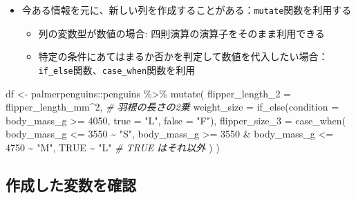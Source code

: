 \documentclass[
]{ltjsarticle}
\newenvironment{Shaded}{\begin{snugshade}}{\end{snugshade}}
\newcommand{\AttributeTok}[1]{\textcolor[rgb]{0.77,0.63,0.00}{#1}}
\newcommand{\CommentTok}[1]{\textcolor[rgb]{0.56,0.35,0.01}{\textit{#1}}}
\newcommand{\ConstantTok}[1]{\textcolor[rgb]{0.00,0.00,0.00}{#1}}
\newcommand{\DecValTok}[1]{\textcolor[rgb]{0.00,0.00,0.81}{#1}}
\newcommand{\FunctionTok}[1]{\textcolor[rgb]{0.00,0.00,0.00}{#1}}
\newcommand{\NormalTok}[1]{#1}
\newcommand{\OtherTok}[1]{\textcolor[rgb]{0.56,0.35,0.01}{#1}}
\newcommand{\SpecialCharTok}[1]{\textcolor[rgb]{0.00,0.00,0.00}{#1}}
\newcommand{\StringTok}[1]{\textcolor[rgb]{0.31,0.60,0.02}{#1}}
\providecommand{\tightlist}{%
  \setlength{\itemsep}{0pt}\setlength{\parskip}{0pt}}
\begin{document}
\begin{itemize}
\tightlist
\item
  今ある情報を元に、新しい列を作成することがある：\texttt{mutate}関数を利用する

  \begin{itemize}
  \tightlist
  \item
    列の変数型が数値の場合: 四則演算の演算子をそのまま利用できる
  \item
    特定の条件にあてはまるか否かを判定して数値を代入したい場合：\texttt{if\_else}関数、\texttt{case\_when}関数を利用
  \end{itemize}
\end{itemize}

\begin{Shaded}
\begin{Highlighting}[]
\NormalTok{df }\OtherTok{\textless{}{-}}\NormalTok{ palmerpenguins}\SpecialCharTok{::}\NormalTok{penguins }\SpecialCharTok{\%\textgreater{}\%}
  \FunctionTok{mutate}\NormalTok{(}
    \AttributeTok{flipper\_length\_2 =}\NormalTok{ flipper\_length\_mm}\SpecialCharTok{\^{}}\DecValTok{2}\NormalTok{, }\CommentTok{\# 羽根の長さの2乗}
    \AttributeTok{weight\_size =} \FunctionTok{if\_else}\NormalTok{(}\AttributeTok{condition =}\NormalTok{ body\_mass\_g }\SpecialCharTok{\textgreater{}=} \DecValTok{4050}\NormalTok{, }\AttributeTok{true =} \StringTok{"L"}\NormalTok{, }\AttributeTok{false =} \StringTok{"F"}\NormalTok{),}
    \AttributeTok{flipper\_size\_3 =} \FunctionTok{case\_when}\NormalTok{(}
\NormalTok{      body\_mass\_g }\SpecialCharTok{\textless{}=} \DecValTok{3550} \SpecialCharTok{\textasciitilde{}} \StringTok{"S"}\NormalTok{,}
\NormalTok{      body\_mass\_g }\SpecialCharTok{\textgreater{}=} \DecValTok{3550} \SpecialCharTok{\&}\NormalTok{ body\_mass\_g }\SpecialCharTok{\textless{}=} \DecValTok{4750} \SpecialCharTok{\textasciitilde{}} \StringTok{"M"}\NormalTok{,}
      \ConstantTok{TRUE} \SpecialCharTok{\textasciitilde{}} \StringTok{"L"} \CommentTok{\# TRUE はそれ以外}
\NormalTok{    )}
\NormalTok{  )}
\end{Highlighting}
\end{Shaded}

\hypertarget{ux4f5cux6210ux3057ux305fux5909ux6570ux3092ux78baux8a8d}{%
\subsection{作成した変数を確認}\label{ux4f5cux6210ux3057ux305fux5909ux6570ux3092ux78baux8a8d}}
\end{document}
